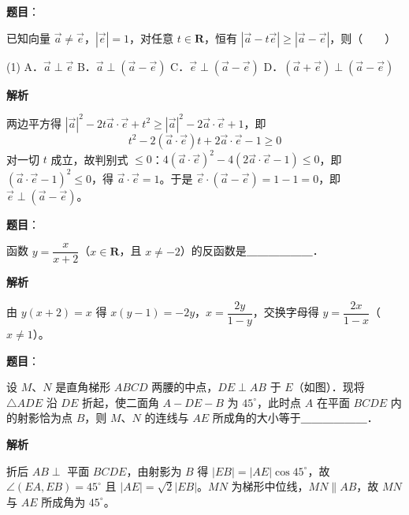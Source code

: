 \begin{answer}

\textbf{题目}：

已知向量 $\vec{a} \neq \vec{e}$，$|\vec{e}| = 1$，对任意 $t \in \mathbf{R}$，恒有 $|\vec{a} - t\vec{e}| \geqslant |\vec{a} - \vec{e}|$，则\mbox{（　　）}

\begin{gkopts}(1)
\task A．$\vec{a} \perp \vec{e}$
\task B．$\vec{a} \perp (\vec{a} - \vec{e})$
\task C．$\vec{e} \perp (\vec{a} - \vec{e})$
\task D．$(\vec{a} + \vec{e}) \perp (\vec{a} - \vec{e})$
\end{gkopts}

\textbf{解析}

两边平方得 $|\vec{a}|^2 - 2t\vec{a}\cdot\vec{e} + t^2 \geqslant |\vec{a}|^2 - 2\vec{a}\cdot\vec{e} + 1$，即
\nopagebreak[4]
\[
t^2 - 2(\vec{a}\cdot\vec{e})t + 2\vec{a}\cdot\vec{e} - 1 \geqslant 0
\]
对一切 $t$ 成立，故判别式 $\leqslant 0$：$4(\vec{a}\cdot\vec{e})^2 - 4(2\vec{a}\cdot\vec{e} - 1) \leqslant 0$，即 $(\vec{a}\cdot\vec{e} - 1)^2 \leqslant 0$，得 $\vec{a}\cdot\vec{e} = 1$。于是 $\vec{e}\cdot(\vec{a} - \vec{e}) = 1 - 1 = 0$，即 $\vec{e} \perp (\vec{a} - \vec{e})$。


\end{answer}
\begin{answer}

\textbf{题目}：

函数 $y = \dfrac{x}{x + 2}$（$x \in \mathbf{R}$，且 $x \neq -2$）的反函数是＿＿＿＿＿＿．

\textbf{解析}

由 $y(x + 2) = x$ 得 $x(y - 1) = -2y$，$x = \dfrac{2y}{1 - y}$，交换字母得 $y = \dfrac{2x}{1 - x}$（$x \neq 1$）。


\end{answer}
\begin{answer}

\textbf{题目}：

设 $M$、$N$ 是直角梯形 $ABCD$ 两腰的中点，$DE \perp AB$ 于 $E$（如图）．现将 $\triangle ADE$ 沿 $DE$ 折起，使二面角 $A - DE - B$ 为 $45^\circ$，此时点 $A$ 在平面 $BCDE$ 内的射影恰为点 $B$，则 $M$、$N$ 的连线与 $AE$ 所成角的大小等于＿＿＿＿＿＿．
\nopagebreak[4]
\begin{center}\end{center}
\nopagebreak[4]
\textbf{解析}

折后 $AB \perp$ 平面 $BCDE$，由射影为 $B$ 得 $|EB| = |AE|\cos 45^\circ$，故 $\angle(EA, EB) = 45^\circ$ 且 $|AE| = \sqrt{2}|EB|$。$MN$ 为梯形中位线，$MN \parallel AB$，故 $MN$ 与 $AE$ 所成角为 $45^\circ$。


\end{answer}
